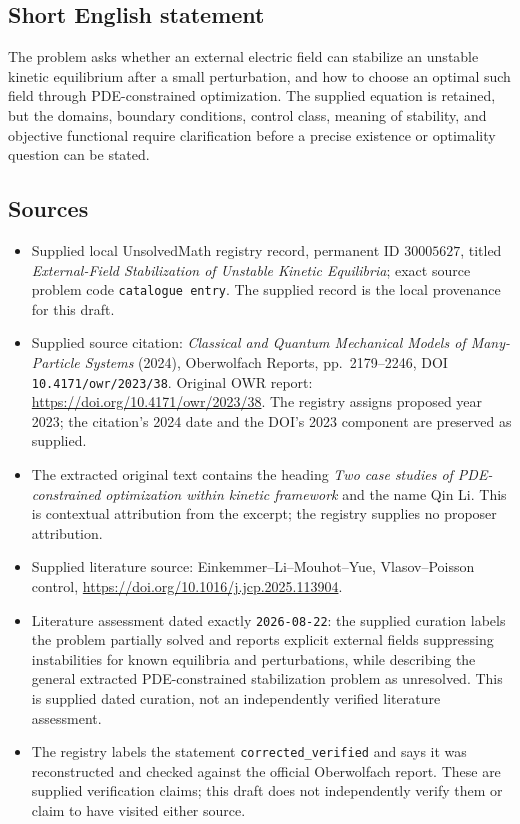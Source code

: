\documentclass[11pt]{article}
\begin{document}
\subsection{Short English statement}
The problem asks whether an external electric field can stabilize an unstable kinetic equilibrium after a small perturbation, and how to choose an optimal such field through PDE-constrained optimization. The supplied equation is retained, but the domains, boundary conditions, control class, meaning of stability, and objective functional require clarification before a precise existence or optimality question can be stated.
\subsection{Sources}
\begin{itemize}
\item Supplied local UnsolvedMath registry record, permanent ID \(30005627\), titled \emph{External-Field Stabilization of Unstable Kinetic Equilibria}; exact source problem code \texttt{catalogue entry}. The supplied record is the local provenance for this draft.
\item Supplied source citation: \emph{Classical and Quantum Mechanical Models of Many-Particle Systems} (2024), Oberwolfach Reports, pp.\ 2179--2246, DOI \texttt{10.4171/owr/2023/38}. Original OWR report: \url{https://doi.org/10.4171/owr/2023/38}. The registry assigns proposed year 2023; the citation's 2024 date and the DOI's 2023 component are preserved as supplied.
\item The extracted original text contains the heading \emph{Two case studies of PDE-constrained optimization within kinetic framework} and the name Qin Li. This is contextual attribution from the excerpt; the registry supplies no proposer attribution.
\item Supplied literature source: Einkemmer--Li--Mouhot--Yue, Vlasov--Poisson control, \url{https://doi.org/10.1016/j.jcp.2025.113904}.
\item Literature assessment dated exactly \texttt{2026-08-22}: the supplied curation labels the problem partially solved and reports explicit external fields suppressing instabilities for known equilibria and perturbations, while describing the general extracted PDE-constrained stabilization problem as unresolved. This is supplied dated curation, not an independently verified literature assessment.
\item The registry labels the statement \texttt{corrected\_verified} and says it was reconstructed and checked against the official Oberwolfach report. These are supplied verification claims; this draft does not independently verify them or claim to have visited either source.
\end{itemize}
\end{document}
